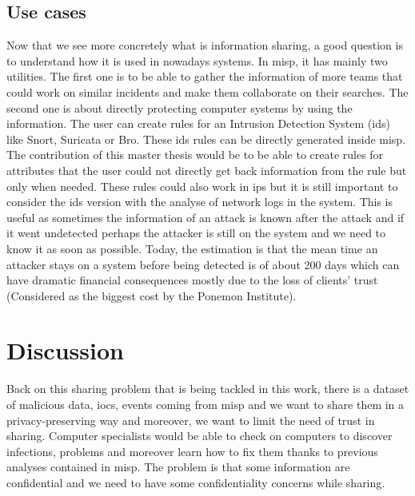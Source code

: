 \documentclass{eplmastersthesis}
\begin{document}
\subsection{Use cases}
Now that we see more concretely what is information sharing, a good question is to understand how it is used in nowadays systems. In \gls{misp}, it has mainly two utilities. The first one is to be able to gather the information of more teams that could work on similar incidents and make them collaborate on their searches.
The second one is about directly protecting computer systems by using the information. The user can create rules for an Intrusion Detection System (\gls{ids}) like Snort, Suricata or Bro. These \gls{ids} rules can be directly generated inside \gls{misp}. The contribution of this master thesis would be to be able to create rules for attributes that the user could not directly get back information from the rule but only when needed.
These rules could also work in \gls{ips} but it is still important to consider the \gls{ids} version with the analyse of network logs in the system. This is useful as sometimes the information of an attack is known after the attack and if it went undetected perhaps the attacker is still on the system and we need to know it as soon as possible.
Today, the estimation is that the mean time an attacker stays on a system before being detected is of about 200 days which can have dramatic financial consequences mostly due to the loss of clients' trust (Considered as the biggest cost by the Ponemon Institute).\\

\section{Discussion}

Back on this sharing problem that is being tackled in this work, there is a dataset of malicious data, \glspl{ioc}, events coming from \gls{misp} and we want to share them in a privacy-preserving way and moreover, we want to limit the need of trust in sharing.
Computer specialists would be able to check on computers to discover infections, problems and moreover learn how to fix them thanks to previous analyses contained in \gls{misp}. The problem is that some information are confidential and we need to have some confidentiality concerns while sharing. \\
\end{document}
